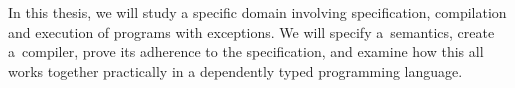In this thesis, we will study a specific domain involving specification, compilation
and execution of programs with exceptions. We will specify
a~semantics, create a~compiler, prove its adherence to the specification, and examine
how this all works together practically in a dependently typed programming language.








































































